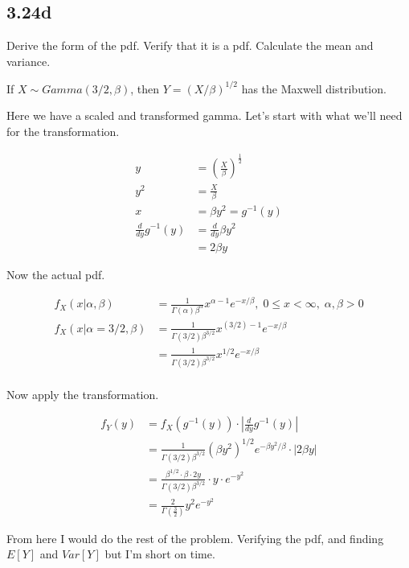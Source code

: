 \subsection*{3.24d}

Derive the form of the pdf. Verify that it is a pdf. Calculate the mean and variance.

\noindent If $X \sim Gamma(3/2, \beta)$, then $Y = (X/\beta)^{1/2}$ has the Maxwell distribution.

Here we have a scaled and transformed gamma. Let's start with what we'll need for the transformation.

\begin{align*}
	y &= \left( \frac{X}{\beta} \right)^{\frac{1}{2}} \\
	y^2 &= \frac{X}{\beta} \\
	x &= \beta y^2 = g^{-1}(y) \\
	\frac{d}{dy} g^{-1}(y) &= \frac{d}{dy} \beta y^2 \\
	&= 2 \beta y
\end{align*}

Now the actual pdf.

\begin{align*}
	f_X(x| \alpha, \beta) &= \frac{1}{\Gamma(\alpha) \beta^{\alpha}} x^{\alpha - 1} e^{-x/\beta}, \; 0 \leq x < \infty, \; \alpha, \beta > 0 \\
	f_X(x | \alpha = 3/2, \beta ) &= \frac{1}{\Gamma(3/2) \beta^{3/2}} x^{(3/2) - 1} e^{-x/\beta} \\
	&= \frac{1}{\Gamma(3/2) \beta^{3/2}} x^{1/2} e^{-x/\beta} \\
\end{align*}

Now apply the transformation.

\begin{align*}
	f_Y(y) &= f_X(g^{-1}(y)) \cdot \left| \frac{d}{dy} g^{-1}(y) \right| \\
	&=  \frac{1}{\Gamma(3/2) \beta^{3/2}} (\beta y^2)^{1/2} e^{-\beta y^2/\beta} \cdot \left| 2 \beta y \right|\\
	&=  \frac{\beta^{1/2} \cdot \beta \cdot 2y}{\Gamma(3/2) \beta^{3/2}} \cdot y \cdot e^{-y^2} \\
	&= \frac{2}{\Gamma(\frac{3}{2})} y^2 e^{-y^2}
\end{align*}

From here I would do the rest of the problem. Verifying the pdf, and finding $E[Y]$ and $Var[Y]$ but I'm short on time.
